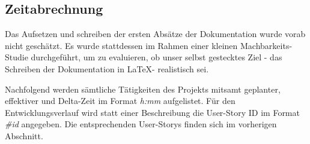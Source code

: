 \subsection{Zeitabrechnung}
Das Aufsetzen und schreiben der ersten Absätze der Dokumentation wurde vorab nicht geschätzt. Es wurde stattdessen im Rahmen einer kleinen Machbarkeits-Studie durchgeführt, um zu evaluieren, ob unser selbst gestecktes Ziel - das Schreiben der Dokumentation in \LaTeX - realistisch sei.

Nachfolgend werden sämtliche Tätigkeiten des Projekts mitsamt geplanter, effektiver und Delta-Zeit im Format \emph{h:mm} aufgelistet. Für den Entwicklungsverlauf wird statt einer Beschreibung die User-Story ID im Format \emph{\#id} angegeben. Die entsprechenden User-Storys finden sich im vorherigen Abschnitt.

\vspace{5mm}

